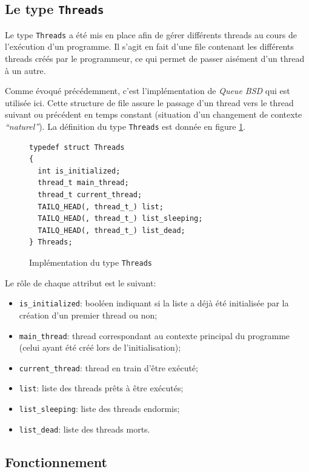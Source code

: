 \documentclass[a4paper,11pt]{article}
\begin{document}
\subsection{Le type \texttt{Threads}}

Le type \texttt{Threads} a été mis en place afin de gérer différents threads au cours de l'exécution d'un programme. Il s'agit en fait d'une file contenant les différents threads créés par le programmeur, ce qui permet de passer aisément d'un thread à un autre.

Comme évoqué précédemment, c'est l'implémentation de \textit{Queue BSD} qui est utilisée ici. Cette structure de file assure le passage d'un thread vers le thread suivant ou précédent en temps constant (situation d'un changement de contexte \textit{``naturel''}). La définition du type \texttt{Threads} est donnée en figure \ref{threadst}.

\begin{figure}[H]
\begin{lstlisting}
typedef struct Threads
{
  int is_initialized;
  thread_t main_thread;
  thread_t current_thread;
  TAILQ_HEAD(, thread_t_) list;
  TAILQ_HEAD(, thread_t_) list_sleeping;
  TAILQ_HEAD(, thread_t_) list_dead;
} Threads;
\end{lstlisting}
\caption{Implémentation du type \texttt{Threads}}
\label{threadst}
\end{figure}

Le rôle de chaque attribut est le suivant:
\begin{itemize}
  \item \texttt{is\_initialized}: booléen indiquant si la liste a déjà été initialisée par la création d'un premier thread ou non;
  \item \texttt{main\_thread}: thread correspondant au contexte principal du programme (celui ayant été créé lors de l'initialisation);
  \item \texttt{current\_thread}: thread en train d'être exécuté;
  \item \texttt{list}: liste des threads prêts à être exécutés;
  \item \texttt{list\_sleeping}: liste des threads endormis;
  \item \texttt{list\_dead}: liste des threads morts.
\end{itemize}

\subsection{Fonctionnement}
\end{document}
